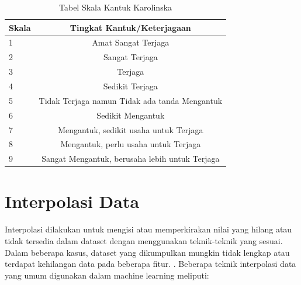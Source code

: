 \begin{table}[h!]
  \centering
  \caption{Tabel Skala Kantuk Karolinska \parencite{19}}
  \begin{tabular}{|p{1.5cm} |c|}

    \hline
    Skala & Tingkat Kantuk/Keterjagaan                     \\
    \hline

    1     & Amat Sangat Terjaga                            \\
    \hline

    2     & Sangat Terjaga                                 \\
    \hline

    3     & Terjaga                                        \\
    \hline

    4     & Sedikit Terjaga                                \\
    \hline

    5     & Tidak Terjaga namun Tidak ada tanda Mengantuk  \\
    \hline

    6     & Sedikit Mengantuk                              \\
    \hline

    7     & Mengantuk, sedikit usaha untuk Terjaga         \\
    \hline

    8     & Mengantuk, perlu usaha untuk Terjaga           \\
    \hline

    9     & Sangat Mengantuk, berusaha lebih untuk Terjaga \\
    \hline
  \end{tabular}
  \label{tbl:Skala}
\end{table}

\section{Interpolasi Data}

Interpolasi dilakukan untuk mengisi atau memperkirakan nilai yang hilang atau
tidak tersedia dalam dataset dengan menggunakan teknik-teknik yang sesuai. Dalam
beberapa kasus, dataset yang dikumpulkan mungkin tidak lengkap atau terdapat
kehilangan data pada beberapa fitur. \parencite{24}. Beberapa teknik interpolasi
data yang umum digunakan dalam machine learning meliputi:

